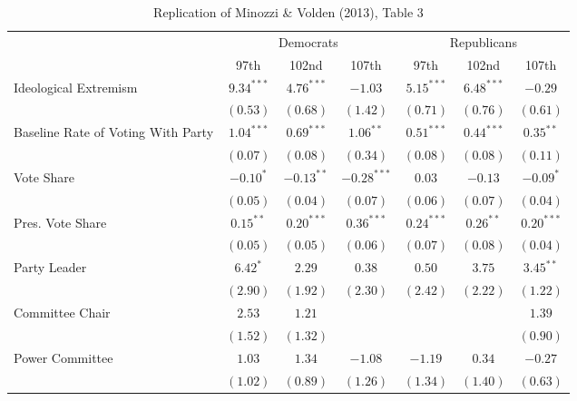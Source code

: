 \documentclass[12pt]{article}
\begin{document}
\begin{table}
	\begin{center}
		\caption{Replication of Minozzi \& Volden (2013), Table 3}
		\begin{tabular}{l c c c c c c }
			\hline
			& \multicolumn{3}{c}{Democrats} & \multicolumn{3}{c}{Republicans} \\
			\cline{2-7}
			& 97th & 102nd & 107th & 97th & 102nd & 107th \\
			\hline
			Ideological Extremism & $9.34^{***}$   & $4.76^{***}$ & $-1.03$       & $5.15^{***}$ & $6.48^{***}$  & $-0.29$       \\
			& $(0.53)$       & $(0.68)$     & $(1.42)$      & $(0.71)$     & $(0.76)$      & $(0.61)$      \\
			Baseline Rate of Voting With Party              & $1.04^{***}$   & $0.69^{***}$ & $1.06^{**}$   & $0.51^{***}$ & $0.44^{***}$  & $0.35^{**}$   \\
			& $(0.07)$       & $(0.08)$     & $(0.34)$      & $(0.08)$     & $(0.08)$      & $(0.11)$      \\
			Vote Share            & $-0.10^{*}$    & $-0.13^{**}$ & $-0.28^{***}$ & $0.03$       & $-0.13$       & $-0.09^{*}$   \\
			& $(0.05)$       & $(0.04)$     & $(0.07)$      & $(0.06)$     & $(0.07)$      & $(0.04)$      \\
			Pres. Vote Share      & $0.15^{**}$    & $0.20^{***}$ & $0.36^{***}$  & $0.24^{***}$ & $0.26^{**}$   & $0.20^{***}$  \\
			& $(0.05)$       & $(0.05)$     & $(0.06)$      & $(0.07)$     & $(0.08)$      & $(0.04)$      \\
			Party Leader                 & $6.42^{*}$     & $2.29$       & $0.38$        & $0.50$       & $3.75$        & $3.45^{**}$   \\
			& $(2.90)$       & $(1.92)$     & $(2.30)$      & $(2.42)$     & $(2.22)$      & $(1.22)$      \\
			Committee Chair                  & $2.53$         & $1.21$       &               &              &               & $1.39$        \\
			& $(1.52)$       & $(1.32)$     &               &              &               & $(0.90)$      \\
			Power Committee                 & $1.03$         & $1.34$       & $-1.08$       & $-1.19$      & $0.34$        & $-0.27$       \\
			& $(1.02)$       & $(0.89)$     & $(1.26)$      & $(1.34)$     & $(1.40)$      & $(0.63)$      \\

\end{tabular}
\end{center}
\end{table}
\end{document}
